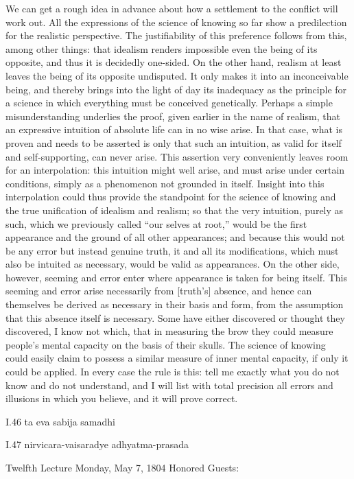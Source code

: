 We can get a rough idea in advance about
how a settlement to the conflict will work out.
All the expressions of the science of knowing so far
show a predilection for the realistic perspective.
The justifiability of this preference follows
from this, among other things:
that idealism renders impossible
even the being of its opposite,
and thus it is decidedly one-sided.
On the other hand, realism at least leaves
the being of its opposite undisputed.
It only makes it into an inconceivable being,
and thereby brings into the light of day
its inadequacy as the principle for a science
in which everything must be conceived genetically.
Perhaps a simple misunderstanding underlies the proof,
given earlier in the name of realism,
that an expressive intuition of
absolute life can in no wise arise.
In that case, what is proven
and needs to be asserted is only that
such an intuition,
as valid for itself and self-supporting,
can never arise.
This assertion very conveniently
leaves room for an interpolation:
this intuition might well arise,
and must arise under certain conditions,
simply as a phenomenon not grounded in itself.
Insight into this interpolation could thus provide
the standpoint for the science of knowing
and the true unification of idealism and realism;
so that the very intuition, purely as such,
which we previously called “our selves at root,”
would be the first appearance
and the ground of all other appearances;
and because this would not be any error
but instead genuine truth,
it and all its modifications,
which must also be intuited as necessary,
would be valid as appearances.
On the other side, however, seeming and error
enter where appearance is taken for being itself.
This seeming and error arise necessarily from [truth's] absence,
and hence can themselves be derived
as necessary in their basis and form,
from the assumption that this absence itself is necessary.
Some have either discovered or thought they discovered,
I know not which, that in measuring the brow
they could measure people's mental capacity
on the basis of their skulls.
The science of knowing could easily claim
to possess a similar measure of inner mental capacity,
if only it could be applied.
In every case the rule is this:
tell me exactly what you do not know
and do not understand,
and I will list with total precision
all errors and illusions in which you believe,
and it will prove correct.

I.46
ta eva sabija samadhi

I.47
nirvicara-vaisaradye adhyatma-prasada

Twelfth Lecture
Monday, May 7, 1804
Honored Guests:

